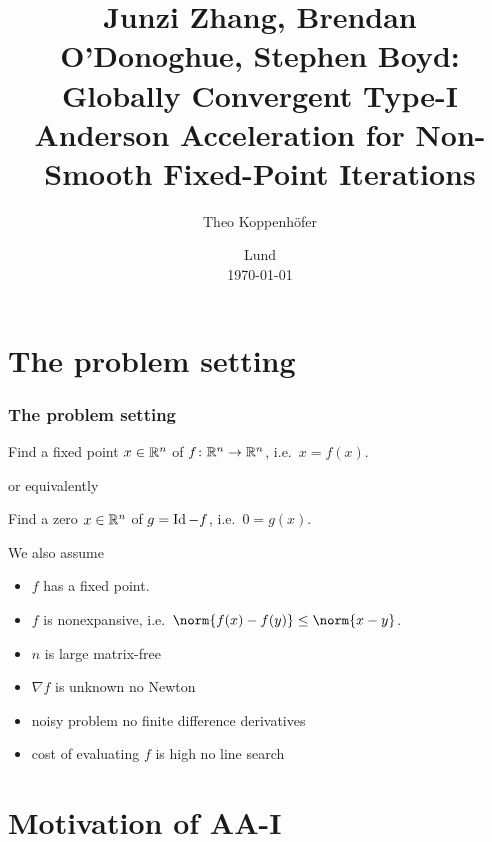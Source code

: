%




\subject{, VT23}
\title{Junzi Zhang, Brendan O'Donoghue, Stephen Boyd: 
Globally Convergent Type-I Anderson Acceleration for Non-Smooth Fixed-Point Iterations}
\author{Theo Koppenhöfer}
\date{Lund \\[1ex] \today}











\frame[plain]{\titlepage}


\section{The problem setting}
\begin{frame}
	\frametitle{The problem setting}
	\begin{problem}
		Find a fixed point $x\in\mathbb{R}^n$ of $f\colon\mathbb{R}^n\to\mathbb{R}^n$, i.e.\ $x=f(x)$.
	\end{problem}
	or equivalently
	\begin{problem}
		Find a zero $x\in\mathbb{R}^n$ of $g=\operatorname{Id}-f$, i.e.\ $0=g(x)$.
	\end{problem}
	We also assume
	\begin{itemize}
		\item $f$ has a fixed point.
		\item $f$ is nonexpansive, i.e.\ $\norm{f(x)-f(y)}\leq\norm{x-y}$.
		\item $n$ is large \textrightarrow matrix-free
		\item $\nabla f$ is unknown \textrightarrow no Newton
		\item noisy problem \textrightarrow no finite difference derivatives
		\item cost of evaluating $f$ is high \textrightarrow no line search
	\end{itemize}
\end{frame}

\section{Motivation of AA-I}

